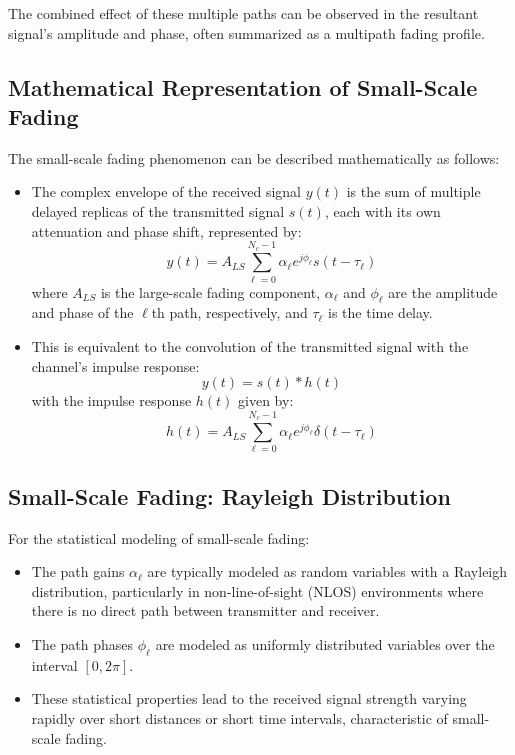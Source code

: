The combined effect of these multiple paths can be observed in the resultant signal's amplitude and phase, often summarized as a multipath fading profile.


\subsection*{Mathematical Representation of Small-Scale Fading}

The small-scale fading phenomenon can be described mathematically as follows:

\begin{itemize}
    \item The complex envelope of the received signal \( y(t) \) is the sum of multiple delayed replicas of the transmitted signal \( s(t) \), each with its own attenuation and phase shift, represented by:
    \[
    y(t) = A_{LS} \sum_{\ell=0}^{N_c-1} \alpha_{\ell} e^{j\phi_{\ell}} s(t - \tau_{\ell})
    \]
    where \( A_{LS} \) is the large-scale fading component, \( \alpha_{\ell} \) and \( \phi_{\ell} \) are the amplitude and phase of the \(\ell\)th path, respectively, and \( \tau_{\ell} \) is the time delay.
    
    \item This is equivalent to the convolution of the transmitted signal with the channel's impulse response:
    \[
    y(t) = s(t) \ast h(t)
    \]
    with the impulse response \( h(t) \) given by:
    \[
    h(t) = A_{LS} \sum_{\ell=0}^{N_c-1} \alpha_{\ell} e^{j\phi_{\ell}} \delta(t - \tau_{\ell})
    \]
\end{itemize}

\subsection*{Small-Scale Fading: Rayleigh Distribution}

For the statistical modeling of small-scale fading:

\begin{itemize}
    \item The path gains \( \alpha_{\ell} \) are typically modeled as random variables with a Rayleigh distribution, particularly in non-line-of-sight (NLOS) environments where there is no direct path between transmitter and receiver.
    \item The path phases \( \phi_{\ell} \) are modeled as uniformly distributed variables over the interval \( [0,2\pi] \).
    \item These statistical properties lead to the received signal strength varying rapidly over short distances or short time intervals, characteristic of small-scale fading.
\end{itemize}







